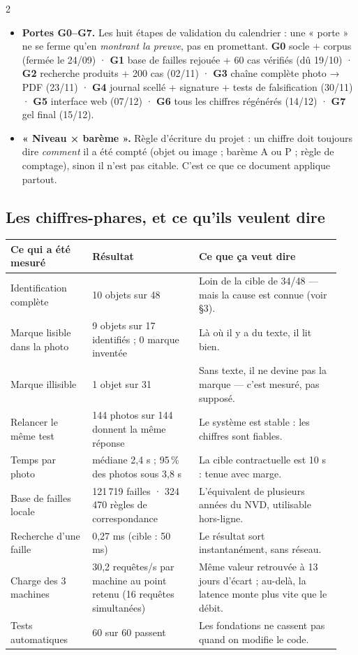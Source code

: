 \documentclass[10pt,a4paper]{article}
\begin{document}
{\begin{multicols}{2}
\begin{itemize}
\item \textbf{Portes G0–G7.} Les huit étapes de validation du calendrier : une « porte » ne se
ferme qu'en \emph{montrant la preuve}, pas en promettant. \textbf{G0} socle + corpus (fermée le
24/09) · \textbf{G1} base de failles rejouée + 60 cas vérifiés (dû 19/10) · \textbf{G2} recherche
produits + 200 cas (02/11) · \textbf{G3} chaîne complète photo → PDF (23/11) · \textbf{G4} journal
scellé + signature + tests de falsification (30/11) · \textbf{G5} interface web (07/12) ·
\textbf{G6} tous les chiffres régénérés (14/12) · \textbf{G7} gel final (15/12).
\item \textbf{« Niveau × barème ».} Règle d'écriture du projet : un chiffre doit toujours dire
\emph{comment} il a été compté (objet ou image ; barème A ou P ; règle de comptage), sinon il n'est
pas citable. C'est ce que ce document applique partout.
\end{itemize}
\end{multicols}}

\subsection{Les chiffres-phares, et ce qu'ils veulent dire}
\begin{center}
\footnotesize\sffamily
\begin{tabular}{@{}p{0.235\linewidth}p{0.30\linewidth}p{0.40\linewidth}@{}}
\toprule
\textbf{Ce qui a été mesuré} & \textbf{Résultat} & \textbf{Ce que ça veut dire}\\
\midrule
Identification complète & 10 objets sur 48 & Loin de la cible de 34/48 — mais la cause est connue (voir §3).\\
Marque lisible dans la photo & 9 objets sur 17 identifiés ; 0 marque inventée & Là où il y a du texte, il lit bien.\\
Marque illisible & 1 objet sur 31 & Sans texte, il ne devine pas la marque — c'est mesuré, pas supposé.\\
Relancer le même test & 144 photos sur 144 donnent la même réponse & Le système est stable : les chiffres sont fiables.\\
Temps par photo & médiane 2,4 s ; 95\,\% des photos sous 3,8 s & La cible contractuelle est 10 s : tenue avec marge.\\
Base de failles locale & 121\,719 failles · 324\,470 règles de correspondance & L'équivalent de plusieurs années du NVD, utilisable hors-ligne.\\
Recherche d'une faille & 0,27 ms (cible : 50 ms) & Le résultat sort instantanément, sans réseau.\\
Charge des 3 machines & 30,2 requêtes/s par machine au point retenu (16 requêtes simultanées) & Même valeur retrouvée à 13 jours d'écart ; au-delà, la latence monte plus vite que le débit.\\
Tests automatiques & 60 sur 60 passent & Les fondations ne cassent pas quand on modifie le code.\\
\bottomrule
\end{tabular}
\end{center}
\end{document}
